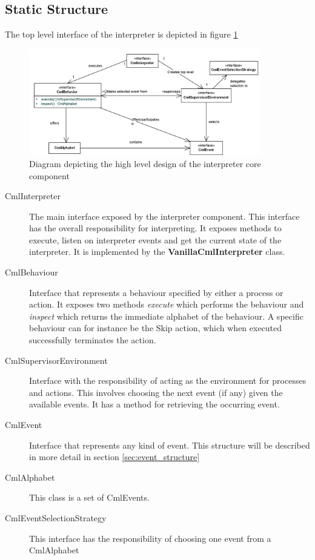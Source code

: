 \documentclass[a4paper, 12pt]{include/compassreport}   %
\begin{document}
\subsection{Static Structure}
\label{sec:dynamic_structure}
The top level interface of the interpreter is depicted in figure \ref{fig:interpreter_topLevelStructure}
\begin{figure}[ht!]
  \begin{center}
    \includegraphics[width=0.9\textwidth]{figures/toplevelStructure}
    \caption{Diagram depicting the high level design of the interpreter core component}
    \label{fig:interpreter_topLevelStructure}
  \end{center}
\end{figure}

\begin{description}
\item[CmlInterpreter] The main interface exposed by
  the interpreter component. This interface has the overall
  responsibility for interpreting. It exposes methods to execute, listen
  on interpreter events and get the current state of the interpreter. It
  is implemented by the \textbf{VanillaCmlInterpreter} class.

\item[CmlBehaviour] Interface that represents a
  behaviour specified by either a process or action. It exposes two
  methods \emph{execute} which performs the behaviour and
  \emph{inspect} which returns the immediate alphabet of the
  behaviour. A specific behaviour can for instance be the Skip action,
  which when executed successfully terminates the action.
\item [CmlSupervisorEnvironment] Interface with the
  responsibility of acting as the environment for processes and
  actions. This involves choosing the next event (if any) given the
  available events. It has a method for retrieving the occurring
  event.
\item[CmlEvent] Interface that represents any kind of event. This
structure will be described in more detail in section
\ref{sec:event_structure}
\item[CmlAlphabet] This class is a set of CmlEvents.
\item[CmlEventSelectionStrategy] This interface has the responsibility
  of choosing one event from a CmlAlphabet
\end{description}
\end{document}
